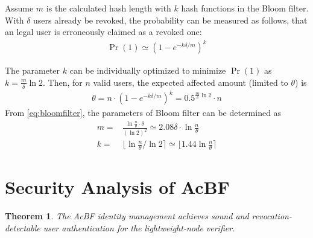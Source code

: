 \documentclass[conference]{IEEEtran}
\newtheorem{theorem}{Theorem}
\begin{document}
Assume $m$ is the calculated hash length with $k$ hash functions in the Bloom filter. With $\delta$ users already be revoked, the probability can be measured as follows, that an legal user is erroneously claimed as a revoked one: 
\begin{align} 
    \Pr(1) \simeq (1 - e^{-k\delta/m})^k 
 \end{align}

The parameter $k$ can be individually optimized to minimize $\Pr(1)$ as $ k = \frac{m}{\delta}\ln 2$. Then, for $n$ valid users, the expected affected amount (limited to $\theta$) is 
\begin{align}\label{eq:bloomfilter}
    \theta = n \cdot (1 - e^{-k\delta/m})^{k} = 0.5^{\frac{m}{\delta}\ln 2}\cdot n
\end{align}
From \eqref{eq:bloomfilter}, the parameters of Bloom filter can be determined as 
\begin{align}
m = & \frac{\ln \frac{n}{\theta} \cdot \delta}{(\ln 2)^2} \simeq 2.08\delta \cdot\ln \frac{n}{\theta}\\
k = & \lfloor \ln \frac{n}{\theta} / \ln 2 \rceil \simeq \lfloor 1.44 \ln \frac{n}{\theta} \rceil
\end{align}

\section{Security Analysis of AcBF}
\begin{theorem}\label{theo:security}
	The AcBF identity management achieves sound and revocation-detectable user authentication for the lightweight-node verifier.
\end{theorem}
\end{document}
